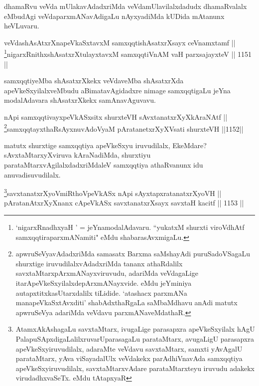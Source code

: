 \begin{artha}
dhamaRvu veVda mUlakavAdadxriMda veVdamUlavilalxdadudx dhamaRvalalx eMbudAgi veVdaparxmANavAdigaLu nAyxyadiMda kUDida mAtanunx heVLuvaru.
\end{artha}


\begin{shl}
veVdashAsAtxrXnapeVkaSxtavxM samxqqtishAsatxrXsayx ceVnamxtamf ||  \\
\footnote{`nigarxRnadhxyaH ' = jeYnamodalAdavaru. ``yukatxM shurxti viroVdhAtf samxqqtiraparxmANamiti" eMdu shabarasAvxmigaLu.}nigarxRnithxshAsatxrXtulayxtavxM samxqqtiVnAM vaH parxsajayxteV \hfill || 1151 ||  
\end{shl}


\begin{artha}
samxqqtiyeMba shAsatxrXkekx veVdaveMba shAsatxrXda apeVkeSxyilalxveMbudu aBimatavAgidadxre nimage samxqqtigaLu jeYna modalAdavara shAsatxrXkekx samAnavAguvavu.
\end{artha}


\begin{shl}
nApi samxqqtivayxpeVkASx\s sitx shurxteVH sAvxtanatxrXyXkAraNAtf || \\
\footnote{apwruSeVyavAdadxriMda samasatx Barxma saMshayAdi puruSadoVSagaLu shurxtige iruvudilalxvAdadxriMda tananx athaRdalilx savxtaMtarxpArxmANayxviruvudu, adariMda veVdagaLige itarApeVkeSxyilalxde\break pArxmANayxvide. eMdu jeYminiya autapxtitxkasUtarxdalilx tiLidide. `atashacx parxmANa manapeVkaSxtAvxditi' shabAdxthaRgaLa saMbaMdhavu anAdi matutx apwruSeVya adariMda veVdavu parxmANaveMdathaR.}samxqqtayxthaRsAyxnuvAdoV\s yaM pAratanetxrXyXV\s sati shurxteVH \hfill ||1152||  
\end{shl}


\begin{artha}
matutx shurxtige samxqqtiya apeVkeSxyu iruvudilalx, EkeMdare?\break sAvxtaMtarxyXviruva kAraNadiMda, shurxtiyu parataMtarxvAgilalxdadxriMdaleV samxqqtiya athaRvanunx idu anuvadisuvudilalx.
\end{artha}

\begin{shl}
\footnote{AtamxAkAshagaLu savxtaMtarx, ivugaLige parasapxra apeVkeSxyilalx hAgU PalapuSApxdigaLalilxruva\break rUparasagaLu parataMtarx, avugaLigU parasapxra apeVkeSxyiruvudilalx, adaraMte veVdavu savxtaMtarx, samxti yAvAgalU parataMtarx, yAva viSayadalUlx veVdakekx parAdhiVnavAda samxqqtiya apeVkeSxyiruvudilalx, savxtaMtarxvAdare parataMtarxteyu iruvudu adakekx virudadhxvaSeTx. eMdu tAtapxyaR}savxtanatxrXyoVmiRthoV\s peVkASx nApi sAyxtapxratanatxrXyoVH || \\
pAratanAtxrXyXnanx cApeVkASx savxtanatxrXsayx savxtaH kacitf \hfill || 1153 ||  
\end{shl}

